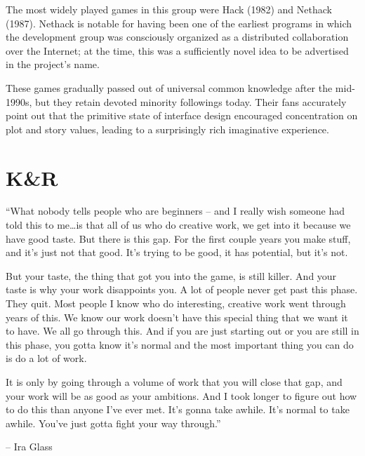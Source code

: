 \documentclass[10pt,twoside,openany]{memoir}
\begin{document}
The most widely played games in this group were Hack (1982) and Nethack (1987). Nethack is notable for having been one of the earliest programs in which the development group was consciously organized as a distributed collaboration over the Internet; at the time, this was a sufficiently novel idea to be advertised in the project's name.

These games gradually passed out of universal common knowledge after the mid-1990s, but they retain devoted minority followings today. Their fans accurately point out that the primitive state of interface design encouraged concentration on plot and story values, leading to a surprisingly rich imaginative experience.

\chapter{K\&R}

``What nobody tells people who are beginners -- and I really wish someone had told this to me\dots is that all of us who do creative work, we get into it because we have good taste. But there is this gap. For the first couple years you make stuff, and it's just not that good. It's trying to be good, it has potential, but it's not.

But your taste, the thing that got you into the game, is still killer. And your taste is why your work disappoints you. A lot of people never get past this phase. They quit. Most people I know who do interesting, creative work went through years of this. We know our work doesn't have this special thing that we want it to have. We all go through this. And if you are just starting out or you are still in this phase, you gotta know it's normal and the most important thing you can do is do a lot of work.

It is only by going through a volume of work that you will close that gap, and your work will be as good as your ambitions. And I took longer to figure out how to do this than anyone I've ever met. It's gonna take awhile. It's normal to take awhile. You've just gotta fight your way through.''

-- Ira Glass

\vskip 0.5in
\end{document}
